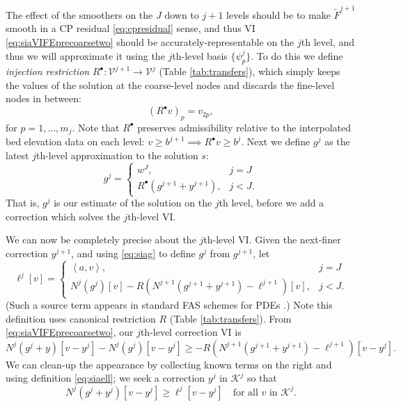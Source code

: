 \documentclass[letterpaper,final,12pt,reqno]{amsart}
\theoremstyle{claim}
\newcommand{\ip}[2]{\left<#1,#2\right>}
\newcommand{\iR}{R^{\bullet}}
\numberwithin{equation}{section}
\numberwithin{figure}{section}
\numberwithin{table}{section}
\numberwithin{theorem}{section}
\begin{document}
The effect of the smoothers on the $J$ down to $j+1$ levels should be to make $\tilde F^{j+1}$ smooth in a CP residual \eqref{eq:cpresidual} sense, and thus VI \eqref{eq:siaVIFEprecoarsetwo} should be accurately-representable on the $j$th level, and thus we will approximate it using the $j$th-level basis $\{\psi_p^j\}$.  To do this we define \emph{injection restriction} $\iR:\mathcal{V}^{j+1} \to \mathcal{V}^j$ (Table \ref{tab:transfers}), which simply keeps the values of the solution at the coarse-level nodes and discards the fine-level nodes in between:
\begin{equation}
  (\iR v)_p = v_{2p}, \label{eq:injectionrestriction}
\end{equation}
for $p=1,\dots,m_j$.  Note that $\iR$ preserves admissibility relative to the interpolated bed elevation data on each level: $v\ge b^{j+1} \implies \iR v \ge b^j$.  Next we define $g^j$ as the latest $j$th-level approximation to the solution $s$:
\begin{equation}
g^j = \begin{cases} w^J, & j=J \\
                    \iR(g^{j+1} + y^{j+1}), & j < J.
      \end{cases}  \label{eq:siag}
\end{equation}
That is, $g^j$ is our estimate of the solution on the $j$th level, before we add a correction which solves the $j$th-level VI.

We can now be completely precise about the $j$th-level VI.  Given the next-finer correction $y^{j+1}$, and using \eqref{eq:siag} to define $g^j$ from $g^{j+1}$, let
\begin{equation}
\ell^j[v] = \begin{cases} \ip{a}{v}, & j=J \\
                          N^j(g^j)[v] - R \left(N^{j+1}(g^{j+1}+y^{j+1}) - \ell^{j+1}\right)[v], & j < J.
            \end{cases}  \label{eq:siaell}
\end{equation}
(Such a source term appears in standard FAS schemes for PDEs \cite{Trottenbergetal2001}.)  Note this definition uses canonical restriction $R$ (Table \ref{tab:transfers}).  From \eqref{eq:siaVIFEprecoarsetwo}, our $j$th-level correction VI is
\begin{equation}
N^j(g^j+y)[v-y^j] - N^j(g^j)[v-y^j] \ge - R \left(N^{j+1}(g^{j+1}+y^{j+1}) - \ell^{j+1}\right)[v-y^j]. \label{eq:siaVIFEFASearly}
\end{equation}
We can clean-up the appearance by collecting known terms on the right and using definition \eqref{eq:siaell}; we seek a correction $y^j$ in $\mathcal{K}^j$ so that
\begin{equation}
N^j(g^j+y^j)[v-y^j] \ge \ell^j[v-y^j] \quad \text{for all $v$ in $\mathcal{K}^j$.} \label{eq:siaVIFEFAS}
\end{equation}
\end{document}
